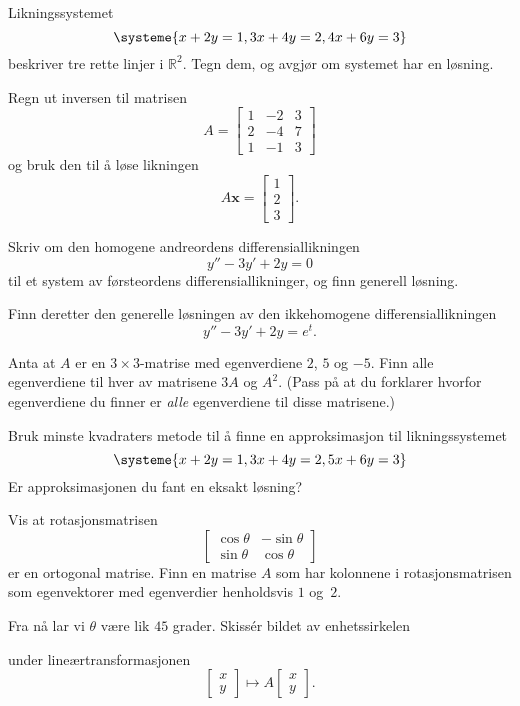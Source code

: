 \documentclass[titlepage,a4paper,12pt,norsk]{IMFeksamen}
\newcommand{\V}[1]{\mathbf{#1}}
\newcommand{\vv}[2]{\begin{bmatrix} #1 \\ #2 \end{bmatrix}}
\newcommand{\vvv}[3]{\begin{bmatrix} #1 \\ #2 \\ #3 \end{bmatrix}}
\newcommand{\x}{\V{x}}
\newcommand{\0}{\V{0}}
\begin{document}
\begin{oppgave}
Likningssystemet 
\[
\systeme{
x + 2y = 1,
3x + 4y = 2,
4x + 6y = 3
}
\]
beskriver tre rette linjer i $\mathbb R^2$. Tegn dem, og avgjør om systemet har en løsning.
\end{oppgave}


\begin{oppgave}
Regn ut inversen til matrisen
\[
A =
\begin{bmatrix}
1 & -2 & 3 \\
2 & -4 & 7 \\
1 & -1 & 3
\end{bmatrix}
\]
og bruk den til å løse likningen
\[
A \x = \vvv{1}{2}{3}.
\]
\end{oppgave}


\begin{oppgave}
Skriv om den homogene andreordens differensiallikningen
\[
y'' - 3y' + 2y = 0
\]
til et system av førsteordens differensiallikninger,
og finn generell løsning.

Finn deretter den generelle løsningen av den ikkehomogene
differensiallikningen
\[
y'' - 3y' + 2y = e^t.
\]
\end{oppgave}


\begin{oppgave}
Anta at $A$ er en $3 \times 3$-matrise med egenverdiene $2$, $5$ og $-5$.
Finn alle egenverdiene til hver av matrisene $3A$ og $A^2$.
(Pass på at du forklarer hvorfor egenverdiene du finner er \emph{alle} egenverdiene
til disse matrisene.)
\end{oppgave}


\begin{oppgave}
Bruk minste kvadraters metode til å finne en approksimasjon til likningssystemet
\[
\systeme{
x + 2y = 1,
3x + 4y = 2,
5x + 6y = 3
}
\]
Er approksimasjonen du fant en eksakt løsning?
\end{oppgave}


\begin{oppgave}
Vis at rotasjonsmatrisen 
\[
\begin{bmatrix}
\cos \theta  & -\sin \theta  \\  \sin \theta & \cos \theta 
\end{bmatrix}
\]
er en ortogonal matrise.
Finn en matrise $A$ som har kolonnene i rotasjonsmatrisen som egenvektorer
med egenverdier henholdsvis $1$ og~$2$.

Fra nå lar vi $\theta$ være lik $45$ grader. Skissér bildet av enhetssirkelen
\begin{center}
\end{center}
under lineærtransformasjonen
\[
\vv{x}{y}\mapsto A\vv{x}{y}.
\]
\end{oppgave}
\end{document}
